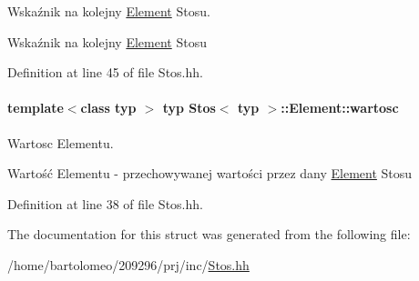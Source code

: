 Wskaźnik na kolejny \hyperlink{struct_stos_1_1_element}{Element} Stosu. 

Wskaźnik na kolejny \hyperlink{struct_stos_1_1_element}{Element} Stosu 

Definition at line 45 of file Stos.\-hh.

\hypertarget{struct_stos_1_1_element_aefe1cc964fd3a547e0a1d15fd18664a1}{
\paragraph[{wartosc}]{\setlength{\rightskip}{0pt plus 5cm}template$<$class typ $>$ typ {\bf Stos}$<$ typ $>$\-::Element\-::wartosc}}\label{struct_stos_1_1_element_aefe1cc964fd3a547e0a1d15fd18664a1}


Wartosc Elementu. 

Wartość Elementu -\/ przechowywanej wartości przez dany \hyperlink{struct_stos_1_1_element}{Element} Stosu 

Definition at line 38 of file Stos.\-hh.



The documentation for this struct was generated from the following file\-:\begin{DoxyCompactItemize}
\item 
/home/bartolomeo/209296/prj/inc/\hyperlink{_stos_8hh}{Stos.\-hh}\end{DoxyCompactItemize}
